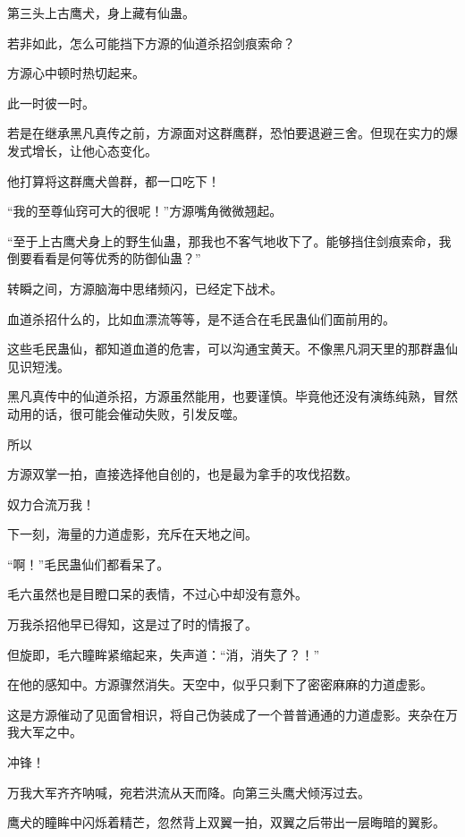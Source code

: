 
\begin{this_body}



第三头上古鹰犬，身上藏有仙蛊。

若非如此，怎么可能挡下方源的仙道杀招剑痕索命？

方源心中顿时热切起来。

此一时彼一时。

若是在继承黑凡真传之前，方源面对这群鹰群，恐怕要退避三舍。但现在实力的爆发式增长，让他心态变化。

他打算将这群鹰犬兽群，都一口吃下！

“我的至尊仙窍可大的很呢！”方源嘴角微微翘起。

“至于上古鹰犬身上的野生仙蛊，那我也不客气地收下了。能够挡住剑痕索命，我倒要看看是何等优秀的防御仙蛊？”

转瞬之间，方源脑海中思绪频闪，已经定下战术。

血道杀招什么的，比如血漂流等等，是不适合在毛民蛊仙们面前用的。

这些毛民蛊仙，都知道血道的危害，可以沟通宝黄天。不像黑凡洞天里的那群蛊仙见识短浅。

黑凡真传中的仙道杀招，方源虽然能用，也要谨慎。毕竟他还没有演练纯熟，冒然动用的话，很可能会催动失败，引发反噬。

所以

方源双掌一拍，直接选择他自创的，也是最为拿手的攻伐招数。

奴力合流万我！

下一刻，海量的力道虚影，充斥在天地之间。

“啊！”毛民蛊仙们都看呆了。

毛六虽然也是目瞪口呆的表情，不过心中却没有意外。

万我杀招他早已得知，这是过了时的情报了。

但旋即，毛六瞳眸紧缩起来，失声道：“消，消失了？！”

在他的感知中。方源骤然消失。天空中，似乎只剩下了密密麻麻的力道虚影。

这是方源催动了见面曾相识，将自己伪装成了一个普普通通的力道虚影。夹杂在万我大军之中。

冲锋！

万我大军齐齐呐喊，宛若洪流从天而降。向第三头鹰犬倾泻过去。

鹰犬的瞳眸中闪烁着精芒，忽然背上双翼一拍，双翼之后带出一层晦暗的翼影。


\end{this_body}
